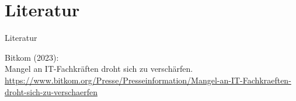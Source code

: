 \documentclass[
	aspectratio=169,	%
	onlytextwidth,		%
	t,					%
	]{beamer}
\begin{document}
%
%
%
%
%
	\appendix
	\appendix
	\section*{Literatur}
	
	\begin{frame}[allowframebreaks]{Literatur}
		\begin{thebibliography}{9}
			Bitkom (2023): \\
			Mangel an IT-Fachkräften droht sich zu verschärfen. \\
			\url{https://www.bitkom.org/Presse/Presseinformation/Mangel-an-IT-Fachkraeften-droht-sich-zu-verschaerfen}
		\end{thebibliography}
	\end{frame}
	
	\makethankyou
%
%
\end{document}

